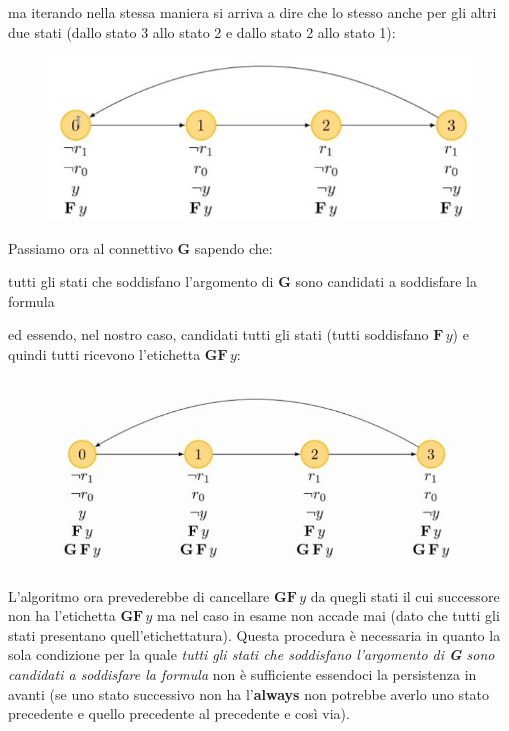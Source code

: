 \documentclass[a4paper,12pt, oneside]{book}
\begin{document}
\newpage
ma iterando nella stessa maniera si arriva a dire che lo stesso anche per gli
altri due stati (dallo stato 3 allo stato 2 e dallo stato 2 allo stato 1):
\begin{figure}[H]
  \centering
  \includegraphics[scale = 0.5]{img/4c5.jpg} 
\end{figure}
Passiamo ora al connettivo \textbf{G} sapendo che:
\begin{center}
  tutti gli stati che soddisfano l'argomento di \textbf{G} sono candidati a
  soddisfare la formula
\end{center}
ed essendo, nel nostro caso, candidati tutti gli stati (tutti soddisfano
$\mathbf{F}\,y$) e quindi tutti ricevono l'etichetta $\mathbf{GF}\,y$:
\begin{figure}[H]
  \centering
  \includegraphics[scale = 0.5]{img/4c.jpg} 
\end{figure}
L'algoritmo ora prevederebbe di cancellare $\mathbf{GF}\,y$ da quegli stati il
cui successore non ha l'etichetta $\mathbf{GF}\,y$ ma nel caso in esame non
accade mai (dato che tutti gli stati presentano quell'etichettatura). Questa
procedura è necessaria in quanto la sola condizione per la quale \textit{tutti
  gli stati che soddisfano l'argomento di \textbf{G} sono candidati a soddisfare
  la formula} non è sufficiente essendoci la persistenza in avanti (se uno stato
successivo non ha l'\textbf{always} non potrebbe averlo uno stato precedente e
quello precedente al precedente e così via).
\end{document}
